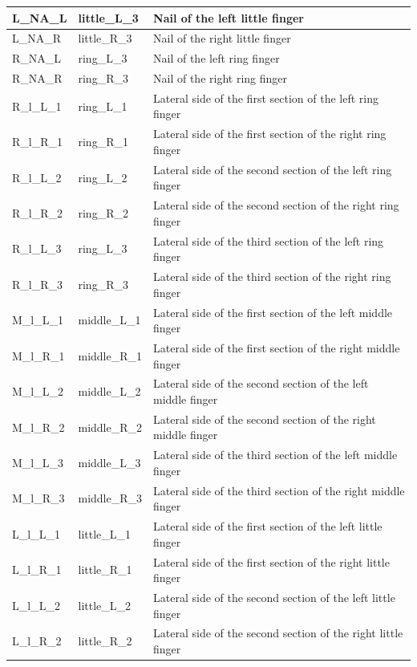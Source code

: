 \documentclass[../main.tex]{subfiles}
\begin{document}
\begin{longtable}{|p{2cm}|p{3cm}|p{5cm}|}
    L\_NA\_L & little\_L\_3 & Nail of the left little finger \\ \hline
    L\_NA\_R & little\_R\_3 & Nail of the right little finger \\ \hline
    R\_NA\_L & ring\_L\_3 & Nail of the left ring finger \\ \hline
    R\_NA\_R & ring\_R\_3 & Nail of the right ring finger \\ \hline
    R\_l\_L\_1 & ring\_L\_1 & Lateral side of the first section of the left ring finger \\ \hline
    R\_l\_R\_1 & ring\_R\_1 & Lateral side of the first section of the right ring finger \\ \hline
    R\_l\_L\_2 & ring\_L\_2 & Lateral side of the second section of the left ring finger \\ \hline
    R\_l\_R\_2 & ring\_R\_2 & Lateral side of the second section of the right ring finger \\ \hline
    R\_l\_L\_3 & ring\_L\_3 & Lateral side of the third section of the left ring finger \\ \hline
    R\_l\_R\_3 & ring\_R\_3 & Lateral side of the third section of the right ring finger \\ \hline
    M\_l\_L\_1 & middle\_L\_1 & Lateral side of the first section of the left middle finger \\ \hline
    M\_l\_R\_1 & middle\_R\_1 & Lateral side of the first section of the right middle finger \\ \hline
    M\_l\_L\_2 & middle\_L\_2 & Lateral side of the second section of the left middle finger \\ \hline
    M\_l\_R\_2 & middle\_R\_2 & Lateral side of the second section of the right middle finger \\ \hline
    M\_l\_L\_3 & middle\_L\_3 & Lateral side of the third section of the left middle finger \\ \hline
    M\_l\_R\_3 & middle\_R\_3 & Lateral side of the third section of the right middle finger \\ \hline
    L\_l\_L\_1 & little\_L\_1 & Lateral side of the first section of the left little finger \\ \hline
    L\_l\_R\_1 & little\_R\_1 & Lateral side of the first section of the right little finger \\ \hline
    L\_l\_L\_2 & little\_L\_2 & Lateral side of the second section of the left little finger \\ \hline
    L\_l\_R\_2 & little\_R\_2 & Lateral side of the second section of the right little finger \\ \hline

\end{longtable}
\end{document}
